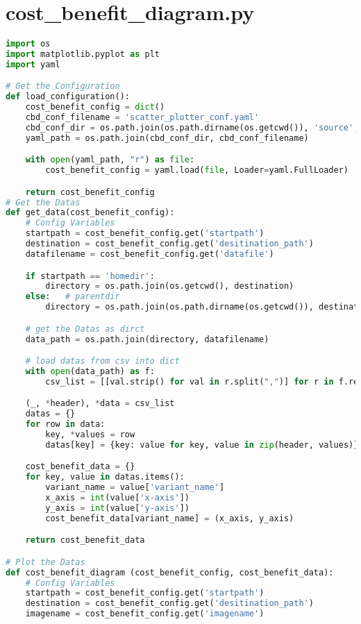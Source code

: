 \section{cost\_benefit\_diagram.py}
\lstset{style=gra_codestyle}
\begin{lstlisting}[language=python, caption=Python LaTex - cost\_benefit\_diagram.py - Kosten-Nutzen-Diagramm,captionpos=b,label={lst:cost_benefit_diagram},breaklines=true]
import os
import matplotlib.pyplot as plt
import yaml

# Get the Configuration
def load_configuration():
    cost_benefit_config = dict()
    cbd_conf_filename = 'scatter_plotter_conf.yaml'
    cbd_conf_dir = os.path.join(os.path.dirname(os.getcwd()), 'source', 'configuration')
    yaml_path = os.path.join(cbd_conf_dir, cbd_conf_filename)

    with open(yaml_path, "r") as file:
        cost_benefit_config = yaml.load(file, Loader=yaml.FullLoader)

    return cost_benefit_config
# Get the Datas
def get_data(cost_benefit_config):
    # Config Variables
    startpath = cost_benefit_config.get('startpath')
    destination = cost_benefit_config.get('desitination_path')
    datafilename = cost_benefit_config.get('datafile')

    if startpath == 'homedir':
        directory = os.path.join(os.getcwd(), destination)
    else:   # parentdir
        directory = os.path.join(os.path.dirname(os.getcwd()), destination)

    # get the Datas as dirct
    data_path = os.path.join(directory, datafilename)

    # load datas from csv into dict
    with open(data_path) as f:
        csv_list = [[val.strip() for val in r.split(",")] for r in f.readlines()]

    (_, *header), *data = csv_list
    datas = {}
    for row in data:
        key, *values = row
        datas[key] = {key: value for key, value in zip(header, values)}

    cost_benefit_data = {}
    for key, value in datas.items():
        variant_name = value['variant_name']
        x_axis = int(value['x-axis'])
        y_axis = int(value['y-axis'])
        cost_benefit_data[variant_name] = (x_axis, y_axis)

    return cost_benefit_data

# Plot the Datas
def cost_benefit_diagram (cost_benefit_config, cost_benefit_data):
    # Config Variables
    startpath = cost_benefit_config.get('startpath')
    destination = cost_benefit_config.get('desitination_path')
    imagename = cost_benefit_config.get('imagename')


\end{lstlisting}

